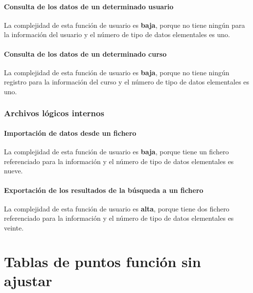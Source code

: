 \documentclass[11pt,a4paper,spanish,twoside]{book}
\begin{document}
\subsubsection{Consulta de los datos de un determinado usuario}
La complejidad de esta función de usuario es \textbf{baja}, porque no tiene
ningún para la información del usuario y el número de tipo de datos
elementales es uno.

\subsubsection{Consulta de los datos de un determinado curso}
La complejidad de esta función de usuario es \textbf{baja}, porque no tiene
ningún registro para la información del curso y el número de tipo de datos
elementales es uno.

\subsection{Archivos lógicos internos}
\subsubsection{Importación de datos desde un fichero}
La complejidad de esta función de usuario es \textbf{baja}, porque tiene un
fichero referenciado para la información y el número de tipo de datos
elementales es nueve.

\subsubsection{Exportación de los resultados de la búsqueda a un fichero}
La complejidad de esta función de usuario es \textbf{alta}, porque tiene dos
fichero referenciado para la información y el número de tipo de datos
elementales es veinte.

\chapter{Tablas de puntos función sin ajustar}
\end{document}

